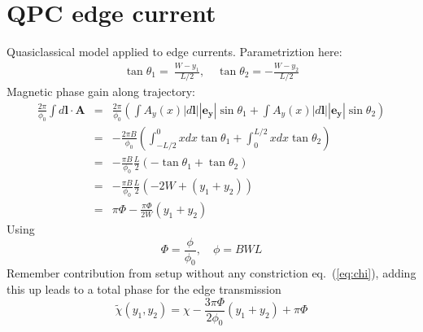 \newpage
\section{QPC edge current}
Quasiclassical model applied to edge currents.
Parametriztion here:
\begin{eqnarray}
\tan \theta_1 = ~\frac{ W - y_1}{L/2}, \quad \tan \theta_2 = -\frac{W - y_2}{L/2}
\end{eqnarray}
Magnetic phase gain along trajectory:
\begin{eqnarray}
\frac{2 \pi}{\phi_0} \int d \mathbf{l} \cdot \mathbf{A} &=& \frac{2 \pi}{\phi_0} \left( \int A_y(x) |d\mathbf{l}| |\mathbf{e_y}| \sin \theta_1 + \int A_y(x) |d\mathbf{l}| |\mathbf{e_y}| \sin \theta_2  \right)\\
&=&  - \frac{2 \pi B}{\phi_0} \left( \int_{-L/2}^{0} x dx \tan \theta_1 + \int_{0}^{L/2} x dx \tan \theta_2 \right) \\
&=&  - \frac{\pi B}{\phi_0} \frac{L}{2} \left( - \tan \theta_1 + \tan \theta_2 \right) \\
&=& - \frac{\pi B}{\phi_0} \frac{L}{2} \left( -2W + (y_1 + y_2) \right)\\
&=& \pi \Phi -\frac{\pi \Phi }{2 W} (y_1 + y_2)  
\end{eqnarray}
Using
\begin{equation}
\Phi = \frac{\phi}{\phi_0}, \quad \phi = B W L
\end{equation}
Remember contribution from setup without any constriction eq.~(\ref{eq:chi}), adding this up leads to a total phase for the edge transmission
\begin{equation}
\tilde{\chi}(y_1, y_2) = \chi - \frac{3 \pi \Phi}{2\phi_0} (y_1 + y_2) + \pi \Phi 
\end{equation}




